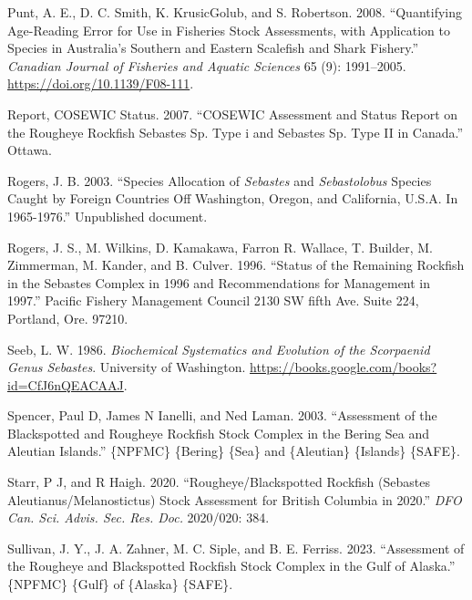 \documentclass[
]{scrartcl}
\newlength{\cslhangindent}
\newenvironment{CSLReferences}[2] %
 {\begin{list}{}{%
  \setlength{\itemindent}{0pt}
  \setlength{\leftmargin}{0pt}
  \setlength{\parsep}{0pt}
  \ifodd #1
   \setlength{\leftmargin}{\cslhangindent}
   \setlength{\itemindent}{-1\cslhangindent}
  \fi
  \setlength{\itemsep}{#2\baselineskip}}}
 {\end{list}}
\begin{document}
\begin{CSLReferences}{1}{0}
Punt, A. E., D. C. Smith, K. KrusicGolub, and S. Robertson. 2008.
{``Quantifying Age-Reading Error for Use in Fisheries Stock Assessments,
with Application to Species in {A}ustralia's Southern and Eastern
Scalefish and Shark Fishery.''} \emph{Canadian Journal of Fisheries and
Aquatic Sciences} 65 (9): 1991--2005.
\url{https://doi.org/10.1139/F08-111}.

Report, COSEWIC Status. 2007. {``COSEWIC Assessment and Status Report on
the Rougheye Rockfish Sebastes Sp. Type i and Sebastes Sp. Type II in
Canada.''} Ottawa.

Rogers, J. B. 2003. {``Species Allocation of \emph{Sebastes} and
\emph{Sebastolobus} Species Caught by Foreign Countries Off
{Washington}, {Oregon}, and {California}, {U}.{S}.{A}. In 1965-1976.''}
Unpublished document.

Rogers, J. S., M. Wilkins, D. Kamakawa, Farron R. Wallace, T. Builder,
M. Zimmerman, M. Kander, and B. Culver. 1996. {``Status of the
{Remaining} {Rockfish} in the {Sebastes} {Complex} in 1996 and
Recommendations for Management in 1997.''} Pacific Fishery Management
Council 2130 SW fifth Ave. Suite 224, Portland, Ore. 97210.

Seeb, L. W. 1986. \emph{Biochemical {Systematics} and {Evolution} of the
{Scorpaenid} {Genus} {Sebastes}}. University of Washington.
\url{https://books.google.com/books?id=CfJ6nQEACAAJ}.

Spencer, Paul D, James N Ianelli, and Ned Laman. 2003. {``Assessment of
the {Blackspotted} and {Rougheye} {Rockfish} {Stock} {Complex} in the
{Bering} {Sea} and {Aleutian} {Islands}.''} \{NPFMC\} \{Bering\} \{Sea\}
and \{Aleutian\} \{Islands\} \{SAFE\}.

Starr, P J, and R Haigh. 2020. {``Rougheye/{Blackspotted} {Rockfish}
({Sebastes} Aleutianus/Melanostictus) Stock Assessment for {British}
{Columbia} in 2020.''} \emph{DFO Can. Sci. Advis. Sec. Res. Doc.}
2020/020: 384.

Sullivan, J. Y., J. A. Zahner, M. C. Siple, and B. E. Ferriss. 2023.
{``Assessment of the {Rougheye} and {Blackspotted} {Rockfish} Stock
Complex in the {Gulf} of {Alaska}.''} \{NPFMC\} \{Gulf\} of \{Alaska\}
\{SAFE\}.


\end{CSLReferences}
\end{document}
